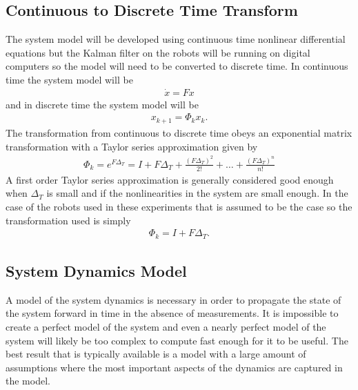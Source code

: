 \subsection{Continuous to Discrete Time Transform}
\label{sec:kfContToDiscTransform}
The system model will be developed using continuous time nonlinear differential equations but the Kalman filter on the robots will be running on digital computers so the model will need to be converted to discrete time. In continuous time the system model will be
\begin{align*}
\dot{x} = Fx
\end{align*}
and in discrete time the system model will be
\begin{align*}
x_{k+1} = \Phi_k x_k.
\end{align*}
The transformation from continuous to discrete time obeys an exponential matrix transformation with a Taylor series approximation \cite{Gelb74} given by
\begin{align*}
\Phi_k = e^{F\Delta_T} = I + F\Delta_T + \frac{(F\Delta_T)^2}{2!} + \ldots + \frac{(F\Delta_T)^n}{n!}
\end{align*}
A first order Taylor series approximation is generally considered good enough when $\Delta_T$ is small and if the nonlinearities in the system are small enough. In the case of the robots used in these experiments that is assumed to be the case so the transformation used is simply
\begin{align}
\label{eq:kfContToDiscTransform}
\Phi_k = I + F\Delta_T.
\end{align}

\subsection{System Dynamics Model}
\label{sec:dynamics}
A model of the system dynamics is necessary in order to propagate the state of the system forward in time in the absence of measurements. It is impossible to create a perfect model of the system and even a nearly perfect model of the system will likely be too complex to compute fast enough for it to be useful. The best result that is typically available is a model with a large amount of assumptions where the most important aspects of the dynamics are captured in the model.

